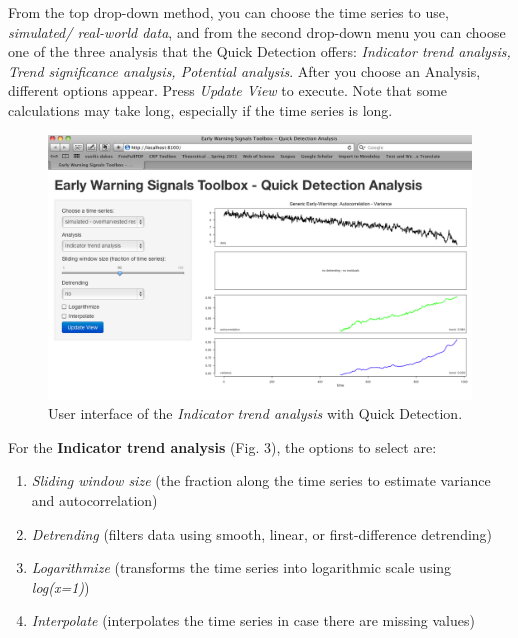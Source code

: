 \documentclass[12pt,a4paper,final]{article}
\begin{document}
\begin{doublespacing}
From the top drop-down method, you can choose the time series to use, \textit{simulated/ real-world data}, and from the second drop-down menu you can choose one of the three analysis that the Quick Detection offers: \textit{Indicator trend analysis, Trend significance analysis, Potential analysis}. After you choose an Analysis, different options appear. Press \textit{Update View} to execute. Note that some calculations may take long, especially if the time series is long.
\begin{figure}[ht]
\begin{center}
\includegraphics[scale=0.4]{demo_start.png}
\caption{User interface of the \textit{Indicator trend analysis} with Quick Detection.}
\end{center}
\end{figure}

For the \textbf{Indicator trend analysis} (Fig. 3), the options to select are:
\begin{enumerate}
\item \textit{Sliding window size} (the fraction along the time series to estimate variance and autocorrelation)
\item  \textit{Detrending} (filters data using smooth, linear, or first-difference detrending)
\item \textit{Logarithmize} (transforms the time series into logarithmic scale using \textit{log(x=1)})
\item \textit{Interpolate} (interpolates the time series in case there are missing values)
\end{enumerate}


\end{doublespacing}
\end{document}
